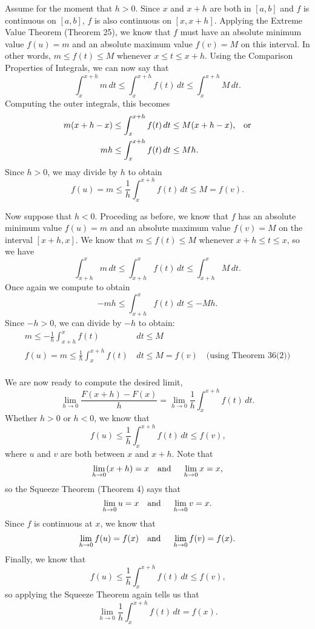 \documentclass[11pt]{report}
\begin{document}
\begin{enumerate}
{Assume for the moment that $h>0$. Since $x$ and $x+h$ are both in $[a,b]$ and $f$ is continuous on $[a,b]$, $f$ is also continuous on $[x,x+h]$. Applying the Extreme Value Theorem (Theorem 25), we know that $f$ must have an absolute minimum value $f(u)=m$ and an absolute maximum value $f(v)=M$ on this interval. In other words, $m\leq f(t)\leq M$ whenever $x\leq t\leq x+h$. Using the Comparison Properties of Integrals, we can now say that \[\int_x^{x+h} m\,dt \leq \int_x^{x+h} f(t)\,dt \leq \int_x^{x+h} M\,dt.\] Computing the outer integrals, this becomes 
\begin{equation*}
\begin{split}
m(x+h-x)\leq \int_x^{x+h} f(t)&\,dt \leq M(x+h-x)\text{,\quad or}\\
mh\leq \int_x^{x+h} f(t)&\,dt \leq Mh.\\
\end{split}
\end{equation*}
Since $h>0$, we may divide by $h$ to obtain \[f(u)=m\leq \frac1h\int_x^{x+h} f(t)\,dt \leq M=f(v).\]

Now suppose that $h<0$. Proceding as before, we know that $f$ has an absolute minimum value $f(u)=m$ and an absolute maximum value $f(v)=M$ on the interval $[x+h,x]$. We know that $m\leq f(t)\leq M$ whenever $x+h\leq t\leq x$, so we have \[\int_{x+h}^x m\,dt\leq\int_{x+h}^x f(t)\,dt\leq \int_{x+h}^x M\,dt.\] Once again we compute to obtain \[ -mh\leq \int_{x+h}^x f(t)\,dt \leq -Mh.\]
Since $-h>0$, we can divide by $-h$ to obtain:
\begin{equation*}
\begin{split}
m\leq -\frac1h\int_{x+h}^x f(t)&\,dt \leq M\\
f(u)=m\leq \frac1h \int_x^{x+h} f(t)&\,dt \leq M=f(v)\quad\text{(using Theorem 36(2))}\\
\end{split}
\end{equation*}

We are now ready to compute the desired limit, \[\lim_{h\to 0}\frac{F(x+h)-F(x)}{h}=\lim_{h\to 0}\frac1h\int_x^{x+h} f(t)\,dt.\] Whether $h>0$ or $h<0$, we know that \[f(u)\leq \frac1h\int_x^{x+h} f(t)\,dt\leq f(v)\text{,}\] where $u$ and $v$ are both between $x$ and $x+h$. Note that 
\[\lim_{h\to 0} (x+h)=x \text{\quad and \quad} \lim_{h\to 0} x=x\text{,}\] so the Squeeze Theorem (Theorem 4) says that \[\lim_{h\to 0}u=x \text{\quad and \quad} \lim_{h\to 0} v=x.\] Since $f$ is continuous at $x$, we know that \[\lim_{h\to 0} f(u)=f(x)\text{\quad and \quad} \lim_{h\to 0}f(v)=f(x).\]  Finally, we know that \[f(u)\leq \frac1h \int_x^{x+h} f(t)\,dt\leq f(v)\text{,}\] so applying the Squeeze Theorem again tells us that \[\lim_{h\to 0}\frac1h\int_x^{x+h} f(t)\,dt=f(x).\] 

}
\end{enumerate}
\end{document}
